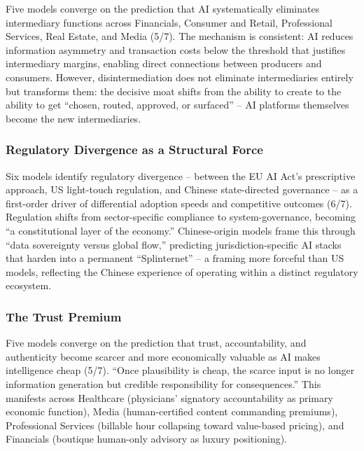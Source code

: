 \documentclass[preprint,review,12pt]{elsarticle}
\begin{document}
Five models converge on the prediction that AI systematically eliminates intermediary functions across Financials, Consumer and Retail, Professional Services, Real Estate, and Media (5/7). The mechanism is consistent: AI reduces information asymmetry and transaction costs below the threshold that justifies intermediary margins, enabling direct connections between producers and consumers. However, disintermediation does not eliminate intermediaries entirely but transforms them: the decisive moat shifts from the ability to create to the ability to get ``chosen, routed, approved, or surfaced'' -- AI platforms themselves become the new intermediaries.


\subsubsection{Regulatory Divergence as a Structural Force}
\label{sec:regulatory_divergence}

Six models identify regulatory divergence -- between the EU AI Act's prescriptive approach, US light-touch regulation, and Chinese state-directed governance -- as a first-order driver of differential adoption speeds and competitive outcomes (6/7). Regulation shifts from sector-specific compliance to system-governance, becoming ``a constitutional layer of the economy.'' Chinese-origin models frame this through ``data sovereignty versus global flow,'' predicting jurisdiction-specific AI stacks that harden into a permanent ``Splinternet'' -- a framing more forceful than US models, reflecting the Chinese experience of operating within a distinct regulatory ecosystem.


\subsubsection{The Trust Premium}
\label{sec:trust_premium}

Five models converge on the prediction that trust, accountability, and authenticity become scarcer and more economically valuable as AI makes intelligence cheap (5/7). ``Once plausibility is cheap, the scarce input is no longer information generation but credible responsibility for consequences.'' This manifests across Healthcare (physicians' signatory accountability as primary economic function), Media (human-certified content commanding premiums), Professional Services (billable hour collapsing toward value-based pricing), and Financials (boutique human-only advisory as luxury positioning).
\end{document}
